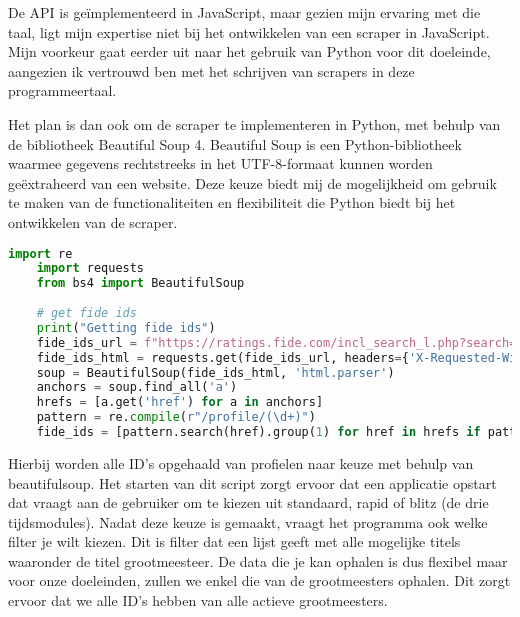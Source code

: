 De API is geïmplementeerd in JavaScript, maar gezien mijn ervaring met die taal, ligt mijn expertise niet bij het ontwikkelen van een scraper in JavaScript. Mijn voorkeur gaat eerder uit naar het gebruik van Python voor dit doeleinde, aangezien ik vertrouwd ben met het schrijven van scrapers in deze programmeertaal.

Het plan is dan ook om de scraper te implementeren in Python, met behulp van de bibliotheek Beautiful Soup 4. Beautiful Soup is een Python-bibliotheek waarmee gegevens rechtstreeks in het UTF-8-formaat kunnen worden geëxtraheerd van een website. Deze keuze biedt mij de mogelijkheid om gebruik te maken van de functionaliteiten en flexibiliteit die Python biedt bij het ontwikkelen van de scraper.\autocite{Richardson}

\begin{lstlisting}[language=Python]
    import re
    import requests
    from bs4 import BeautifulSoup
    
    # get fide ids
    print("Getting fide ids")
    fide_ids_url = f"https://ratings.fide.com/incl_search_l.php?search=&search_rating={rating}&search_country=all&search_title={title}&search_other_title=all&search_year=undefined&search_low=0&search_high=3500&search_inactive=on&search_exrated=off&search_radio=rating&search_bday_start=all&search_bday_end=all&search_radio=rating&search_asc=descending&search_gender=undefined&simple=0"
    fide_ids_html = requests.get(fide_ids_url, headers={'X-Requested-With': 'XMLHttpRequest'}).text
    soup = BeautifulSoup(fide_ids_html, 'html.parser')
    anchors = soup.find_all('a')
    hrefs = [a.get('href') for a in anchors]
    pattern = re.compile(r"/profile/(\d+)")
    fide_ids = [pattern.search(href).group(1) for href in hrefs if pattern.search(href)]
\end{lstlisting}

Hierbij worden alle ID's opgehaald van profielen naar keuze met behulp van beautifulsoup. Het starten van dit script zorgt ervoor dat een applicatie opstart dat vraagt aan de gebruiker om te kiezen uit standaard, rapid of blitz (de drie tijdsmodules). Nadat deze keuze is gemaakt, vraagt het programma ook welke filter je wilt kiezen. Dit is filter dat een lijst geeft met alle mogelijke titels waaronder de titel grootmeesteer. De data die je kan ophalen is dus flexibel maar voor onze doeleinden, zullen we enkel die van de grootmeesters ophalen. Dit zorgt ervoor dat we alle ID's hebben van alle actieve grootmeesters. 

